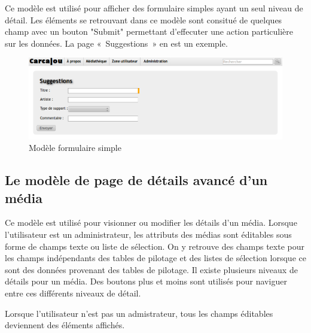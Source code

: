 \documentclass[letter, 11pt]{report}
\begin{document}
Ce modèle est utilisé pour afficher des formulaire simples ayant un seul niveau de détail. Les éléments se retrouvant dans ce modèle sont consitué de quelques champ avec un bouton "Submit" permettant d'effecuter une action particulière sur les données. La page «~Suggestions~» en est un exemple.

\begin{figure}[htbp]
	\begin{center}
		\includegraphics[scale=0.4]{captures_ecran/modele_formulaire_simple.png}
	\end{center}
	\caption{Modèle formulaire simple}
\end{figure}

\subsection{Le modèle de page de détails avancé d'un média}

Ce modèle est utilisé pour visionner ou modifier les détails d'un média. Lorsque l'utilisateur est un administrateur, les attributs des médias sont éditables sous forme de champs texte ou liste de sélection. On y retrouve des champs texte pour les champs indépendants des tables de pilotage et des listes de sélection lorsque ce sont des données provenant des tables de pilotage. Il existe plusieurs niveaux de détails pour un média. Des boutons plus et moins sont utilisés pour naviguer entre ces différents niveaux de détail.

Lorsque l'utilisateur n'est pas un admistrateur, tous les champs éditables deviennent des éléments affichés.
\end{document}
